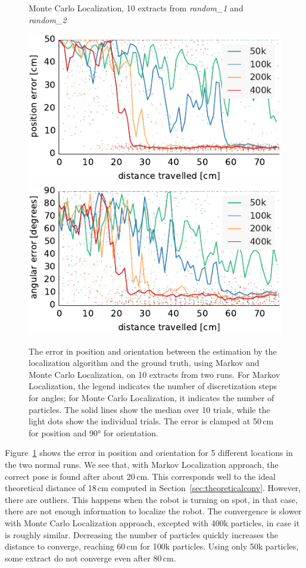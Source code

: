 \documentclass[letterpaper, 10pt, conference]{ieeeconf}
\newcommand{\Fig}[1]{Figure~\ref{fig:#1}}
\newcommand{\sect}[1]{Section~\ref{sec:#1}}
\begin{document}
\begin{figure}
\begin{center}
Monte Carlo Localization, 10 extracts from \emph{random\_1} and \emph{random\_2}
\end{center}
\includegraphics{mcl-small_runs_random_12-xy}\hfill
\includegraphics{mcl-small_runs_random_12-theta}

\caption{
The error in position and orientation between the estimation by the localization algorithm and the ground truth, using Markov and Monte Carlo Localization, on 10 extracts from two runs.
For Markov Localization, the legend indicates the number of discretization steps for angles; for Monte Carlo Localization, it indicates the number of particles.
The solid lines show the median over 10 trials, while the light dots show the individual trials.
The error is clamped at 50\,cm for position and 90° for orientation.}
\label{fig:small-runs}
\end{figure}

\Fig{small-runs} shows the error in position and orientation for 5 different locations in the two normal runs.
We see that, with Markov Localization approach, the correct pose is found after about 20\,cm.
This corresponds well to the ideal theoretical distance of 18\,cm computed in \sect{theoreticalconv}.
However, there are outliers.
This happens when the robot is turning on spot, in that case, there are not enough information to localize the robot.
The convergence is slower with Monte Carlo Localization approach, excepted with 400k particles, in case it is roughly similar.
Decreasing the number of particles quickly increases the distance to converge, reaching 60\,cm for 100k particles.
Using only 50k particles, some extract do not converge even after 80\,cm.
\end{document}
